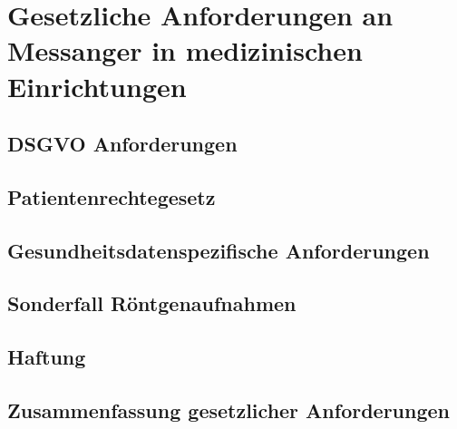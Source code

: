 \chapter{Gesetzliche Anforderungen an Messanger in medizinischen Einrichtungen}\label{chapter:ganforderungen}

\section{DSGVO Anforderungen}\label{section:dsgvo}

\section{Patientenrechtegesetz}\label{section:patientenrechtegesetz}

\section{Gesundheitsdatenspezifische Anforderungen}\label{section:ga}

\section{Sonderfall Röntgenaufnahmen}\label{section:sr}

\section{Haftung}\label{section:haftung}

\section{Zusammenfassung gesetzlicher Anforderungen}\label{section:zga}

